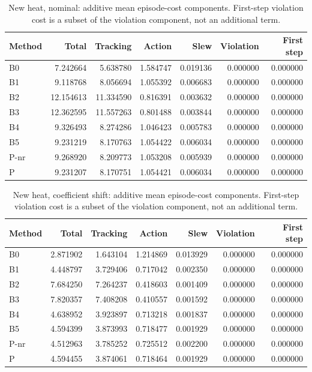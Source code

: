 \begin{table}[ht]
\centering\small
\caption{New heat, nominal: additive mean episode-cost components. First-step violation cost is a subset of the violation component, not an additional term.}\label{tab:new_heat_costparts_locked_nominal}
\begin{tabular}{@{}lrrrrrr@{}}\toprule
Method & Total & Tracking & Action & Slew & Violation & First step\\\midrule
B0 & 7.242664 & 5.638780 & 1.584747 & 0.019136 & 0.000000 & 0.000000\\
B1 & 9.118768 & 8.056694 & 1.055392 & 0.006683 & 0.000000 & 0.000000\\
B2 & 12.154613 & 11.334590 & 0.816391 & 0.003632 & 0.000000 & 0.000000\\
B3 & 12.362595 & 11.557263 & 0.801488 & 0.003844 & 0.000000 & 0.000000\\
B4 & 9.326493 & 8.274286 & 1.046423 & 0.005783 & 0.000000 & 0.000000\\
B5 & 9.231219 & 8.170763 & 1.054422 & 0.006034 & 0.000000 & 0.000000\\
P-nr & 9.268920 & 8.209773 & 1.053208 & 0.005939 & 0.000000 & 0.000000\\
P & 9.231207 & 8.170751 & 1.054421 & 0.006034 & 0.000000 & 0.000000\\
\bottomrule\end{tabular}
\end{table}

\begin{table}[ht]
\centering\small
\caption{New heat, coefficient shift: additive mean episode-cost components. First-step violation cost is a subset of the violation component, not an additional term.}\label{tab:new_heat_costparts_locked_coefficient_ood}
\begin{tabular}{@{}lrrrrrr@{}}\toprule
Method & Total & Tracking & Action & Slew & Violation & First step\\\midrule
B0 & 2.871902 & 1.643104 & 1.214869 & 0.013929 & 0.000000 & 0.000000\\
B1 & 4.448797 & 3.729406 & 0.717042 & 0.002350 & 0.000000 & 0.000000\\
B2 & 7.684250 & 7.264237 & 0.418603 & 0.001409 & 0.000000 & 0.000000\\
B3 & 7.820357 & 7.408208 & 0.410557 & 0.001592 & 0.000000 & 0.000000\\
B4 & 4.638952 & 3.923897 & 0.713218 & 0.001837 & 0.000000 & 0.000000\\
B5 & 4.594399 & 3.873993 & 0.718477 & 0.001929 & 0.000000 & 0.000000\\
P-nr & 4.512963 & 3.785252 & 0.725512 & 0.002200 & 0.000000 & 0.000000\\
P & 4.594455 & 3.874061 & 0.718464 & 0.001929 & 0.000000 & 0.000000\\
\bottomrule\end{tabular}
\end{table}

